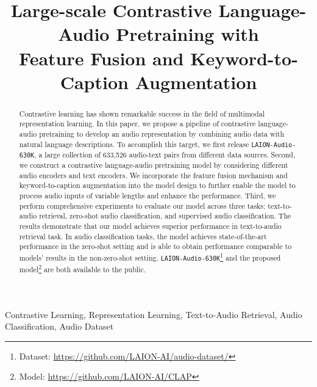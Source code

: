 \title{Large-scale Contrastive Language-Audio Pretraining with \\ Feature Fusion and Keyword-to-Caption Augmentation}



\ninept 

\maketitle

\begin{abstract}
Contrastive learning has shown remarkable success in the field of multimodal representation learning.
In this paper, we propose a pipeline of contrastive language-audio pretraining to develop an audio representation by combining audio data with natural language descriptions. To accomplish this target, we first release \texttt{LAION-Audio-630K}, a large collection of 633,526 audio-text pairs from different data sources. Second, we construct a contrastive language-audio pretraining model by considering different audio encoders and text encoders. We incorporate the feature fusion mechanism and keyword-to-caption augmentation into the model design to further enable the model to process audio inputs of variable lengths and enhance the performance. Third, we perform comprehensive experiments to evaluate our model across three tasks: text-to-audio retrieval, zero-shot audio classification, and supervised audio classification. The results demonstrate that our model achieves superior performance in text-to-audio retrieval task. In audio classification tasks, the model achieves state-of-the-art performance in the zero-shot setting and is able to obtain performance comparable to models' results in the non-zero-shot setting. \texttt{LAION-Audio-630K}\footnote{Dataset: \href{https://github.com/LAION-AI/audio-dataset/}{https://github.com/LAION-AI/audio-dataset/}} and the proposed model\footnote{Model: \href{https://github.com/LAION-AI/CLAP}{https://github.com/LAION-AI/CLAP}} are both available to the public. 
\end{abstract}
\begin{keywords}
Contrastive Learning, Representation Learning, Text-to-Audio Retrieval, Audio Classification, Audio Dataset
\end{keywords}

